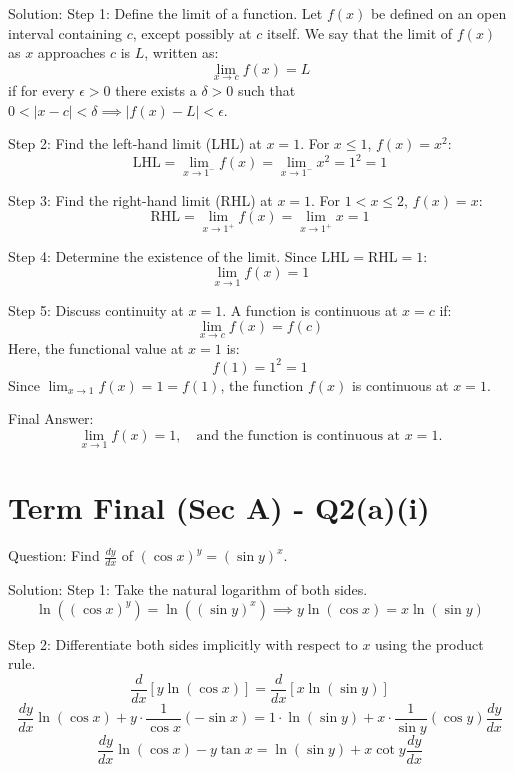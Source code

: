 \documentclass{article}
\begin{document}
Solution:
Step 1: Define the limit of a function.
Let $f(x)$ be defined on an open interval containing $c$, except possibly at $c$ itself. We say that the limit of $f(x)$ as $x$ approaches $c$ is $L$, written as:
\[
\lim_{x \to c} f(x) = L
\]
if for every $\epsilon > 0$ there exists a $\delta > 0$ such that $0 < |x - c| < \delta \implies |f(x) - L| < \epsilon$.

Step 2: Find the left-hand limit (LHL) at $x = 1$.
For $x \le 1$, $f(x) = x^2$:
\[
\text{LHL} = \lim_{x \to 1^-} f(x) = \lim_{x \to 1^-} x^2 = 1^2 = 1
\]

Step 3: Find the right-hand limit (RHL) at $x = 1$.
For $1 < x \le 2$, $f(x) = x$:
\[
\text{RHL} = \lim_{x \to 1^+} f(x) = \lim_{x \to 1^+} x = 1
\]

Step 4: Determine the existence of the limit.
Since $\text{LHL} = \text{RHL} = 1$:
\[
\lim_{x \to 1} f(x) = 1
\]

Step 5: Discuss continuity at $x = 1$.
A function is continuous at $x = c$ if:
\[
\lim_{x \to c} f(x) = f(c)
\]
Here, the functional value at $x = 1$ is:
\[
f(1) = 1^2 = 1
\]
Since $\lim_{x \to 1} f(x) = 1 = f(1)$, the function $f(x)$ is continuous at $x = 1$.

Final Answer:
\[
\boxed{\lim_{x \to 1} f(x) = 1, \quad \text{and the function is continuous at } x = 1.}
\]

\section*{Term Final (Sec A) - Q2(a)(i)}
Question:
Find $\frac{dy}{dx}$ of $(\cos x)^y = (\sin y)^x$.

Solution:
Step 1: Take the natural logarithm of both sides.
\[
\ln\left( (\cos x)^y \right) = \ln\left( (\sin y)^x \right) \implies y \ln(\cos x) = x \ln(\sin y)
\]

Step 2: Differentiate both sides implicitly with respect to $x$ using the product rule.
\[
\frac{d}{dx} [y \ln(\cos x)] = \frac{d}{dx} [x \ln(\sin y)]
\]
\[
\frac{dy}{dx} \ln(\cos x) + y \cdot \frac{1}{\cos x}(-\sin x) = 1 \cdot \ln(\sin y) + x \cdot \frac{1}{\sin y}(\cos y) \frac{dy}{dx}
\]
\[
\frac{dy}{dx} \ln(\cos x) - y \tan x = \ln(\sin y) + x \cot y \frac{dy}{dx}
\]
\end{document}
